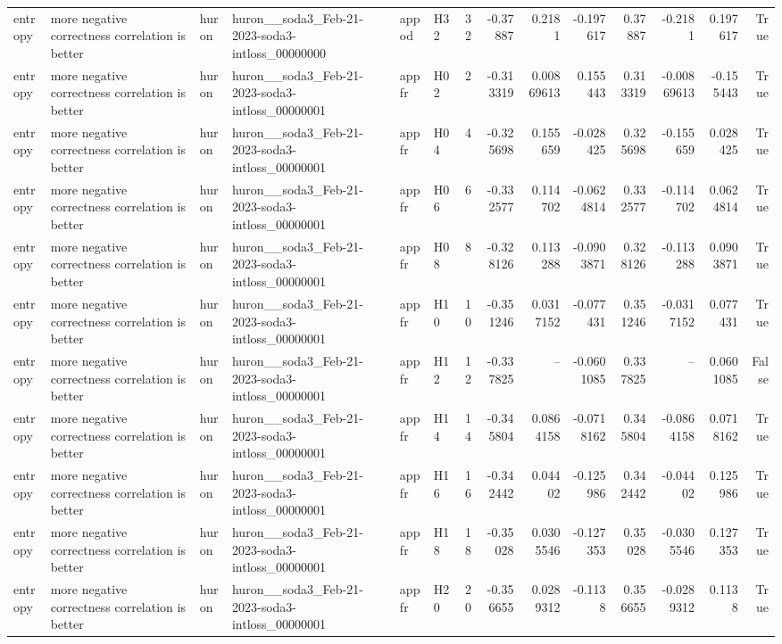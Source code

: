 \begin{longtable}{llllllrrrrrrrr}
entropy & more negative correctness correlation is better & huron & huron\_\_soda3\_Feb-21-2023-soda3-intloss\_00000000 & appod & H32 & 32 & -0.37887 & 0.2181 & -0.197617 & 0.37887 & -0.2181 & 0.197617 & True \\
entropy & more negative correctness correlation is better & huron & huron\_\_soda3\_Feb-21-2023-soda3-intloss\_00000001 & appfr & H02 & 2 & -0.313319 & 0.00869613 & 0.155443 & 0.313319 & -0.00869613 & -0.155443 & True \\
entropy & more negative correctness correlation is better & huron & huron\_\_soda3\_Feb-21-2023-soda3-intloss\_00000001 & appfr & H04 & 4 & -0.325698 & 0.155659 & -0.028425 & 0.325698 & -0.155659 & 0.028425 & True \\
entropy & more negative correctness correlation is better & huron & huron\_\_soda3\_Feb-21-2023-soda3-intloss\_00000001 & appfr & H06 & 6 & -0.332577 & 0.114702 & -0.0624814 & 0.332577 & -0.114702 & 0.0624814 & True \\
entropy & more negative correctness correlation is better & huron & huron\_\_soda3\_Feb-21-2023-soda3-intloss\_00000001 & appfr & H08 & 8 & -0.328126 & 0.113288 & -0.0903871 & 0.328126 & -0.113288 & 0.0903871 & True \\
entropy & more negative correctness correlation is better & huron & huron\_\_soda3\_Feb-21-2023-soda3-intloss\_00000001 & appfr & H10 & 10 & -0.351246 & 0.0317152 & -0.077431 & 0.351246 & -0.0317152 & 0.077431 & True \\
entropy & more negative correctness correlation is better & huron & huron\_\_soda3\_Feb-21-2023-soda3-intloss\_00000001 & appfr & H12 & 12 & -0.337825 & -- & -0.0601085 & 0.337825 & -- & 0.0601085 & False \\
entropy & more negative correctness correlation is better & huron & huron\_\_soda3\_Feb-21-2023-soda3-intloss\_00000001 & appfr & H14 & 14 & -0.345804 & 0.0864158 & -0.0718162 & 0.345804 & -0.0864158 & 0.0718162 & True \\
entropy & more negative correctness correlation is better & huron & huron\_\_soda3\_Feb-21-2023-soda3-intloss\_00000001 & appfr & H16 & 16 & -0.342442 & 0.04402 & -0.125986 & 0.342442 & -0.04402 & 0.125986 & True \\
entropy & more negative correctness correlation is better & huron & huron\_\_soda3\_Feb-21-2023-soda3-intloss\_00000001 & appfr & H18 & 18 & -0.35028 & 0.0305546 & -0.127353 & 0.35028 & -0.0305546 & 0.127353 & True \\
entropy & more negative correctness correlation is better & huron & huron\_\_soda3\_Feb-21-2023-soda3-intloss\_00000001 & appfr & H20 & 20 & -0.356655 & 0.0289312 & -0.1138 & 0.356655 & -0.0289312 & 0.1138 & True \\

\end{longtable}
